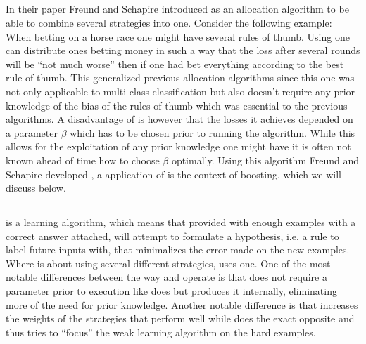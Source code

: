 \subsection*{\hedge}
In their paper Freund and Schapire introduced \hedge as an allocation algorithm to be able to combine several strategies into one. Consider the following example: When betting on a horse race one might have several rules of thumb. Using \hedge one can distribute ones betting money in such a way that the loss after several rounds will be ``not much worse'' then if one had bet everything according to the best rule of thumb. This generalized previous allocation algorithms since this one was not only applicable to multi class classification but also doesn't require any prior knowledge of the bias of the rules of thumb which was essential to the previous algorithms. A disadvantage of \hedge is however that the losses it achieves depended on a parameter $\beta$ which has to be chosen prior to running the algorithm. While this allows for the exploitation of any prior knowledge one might have it is often not known ahead of time how to choose $\beta$ optimally. Using this \hedge algorithm Freund and Schapire developed \adaB, a application of \hedge is the context of boosting, which we will discuss below. 

\subsection*{\adaB}
\adaB is a learning algorithm, which means that provided with enough examples with a correct answer attached, \adaB will attempt to formulate a hypothesis, i.e. a rule to label future inputs with, that minimalizes the error made on the new examples. Where \hedge is about using several different strategies, \adaB uses one. One of the most notable differences between the way \hedge and \adaB operate is that \adaB does not require a parameter prior to execution like \hedge does but produces it internally, eliminating more of the need for prior knowledge. Another notable difference is that \hedge increases the weights of the strategies that perform well while \adaB does the exact opposite and thus tries to ``focus'' the weak learning algorithm on the hard examples. 
